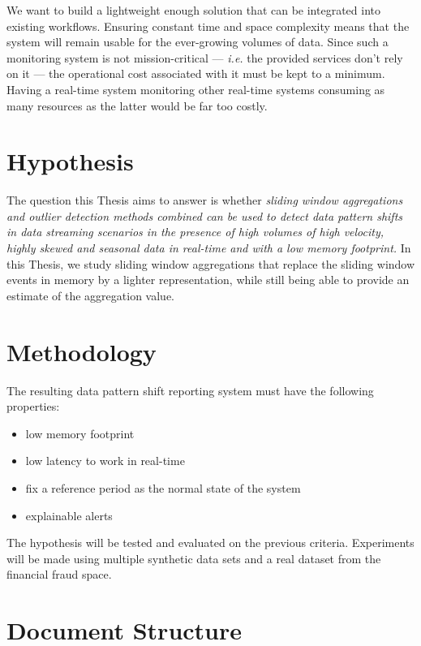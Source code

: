 We want to build a lightweight enough solution that can be integrated into existing workflows. Ensuring constant time and space complexity means that the system will remain usable for the ever-growing volumes of data. Since such a monitoring system is not mission-critical --- \textit{i.e.} the provided services don't rely on it --- the operational cost associated with it must be kept to a minimum. Having a real-time system monitoring other real-time systems consuming as many resources as the latter would be far too costly.

\section{Hypothesis} \label{sec:hypothesis}
The question this Thesis aims to answer is whether \textit{sliding window aggregations and outlier detection methods combined can be used to detect data pattern shifts in data streaming scenarios in the presence of high volumes of high velocity, highly skewed and seasonal data in real-time and with a low memory footprint.} In this Thesis, we study sliding window aggregations that replace the sliding window events in memory by a lighter representation, while still being able to provide an estimate of the aggregation value.

\section{Methodology} \label{sec:methodology}

The resulting data pattern shift reporting system must have the following properties:
\begin{itemize}
    \item low memory footprint
    
    \item low latency to work in real-time
    
    \item fix a reference period as the normal state of the system
    
    \item explainable alerts
\end{itemize}
The hypothesis will be tested and evaluated on the previous criteria. Experiments will be made using multiple synthetic data sets and a real dataset from the financial fraud space.

\section{Document Structure} 

